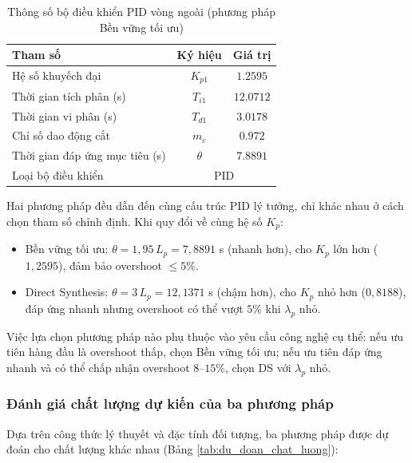 \documentclass[../main.tex]{subfiles}
\begin{document}
\begin{table}[H]
\centering
\caption{Thông số bộ điều khiển PID vòng ngoài (phương pháp Bền vững tối ưu)}
\label{tab:tham_so_pid_vong_ngoai}
\begin{tabular}{|l|c|c|}
\hline
\textbf{Tham số} & \textbf{Ký hiệu} & \textbf{Giá trị}\\ \hline
Hệ số khuyếch đại & $K_{p1}$ & $1.2595$\\ \hline
Thời gian tích phân (s) & $T_{i1}$ & $12.0712$\\ \hline
Thời gian vi phân (s) & $T_{d1}$ & $3.0178$\\ \hline
Chỉ số dao động cắt & $m_c$ & $0.972$\\ \hline
Thời gian đáp ứng mục tiêu (s) & $\theta$ & $7.8891$\\ \hline
Loại bộ điều khiển & \multicolumn{2}{c|}{PID}\\ \hline
\end{tabular}
\end{table}
\begin{tcolorbox}[colback=blue!5!white, colframe=blue!75!black, title={Phân tích so sánh DS với Bền vững tối ưu cho vòng ngoài}]
Hai phương pháp đều dẫn đến cùng cấu trúc PID lý tưởng, chỉ khác nhau ở cách chọn tham số chỉnh định. Khi quy đổi về cùng hệ số $K_p$:
\begin{itemize}
    \item Bền vững tối ưu: $\theta = 1{,}95\,L_p = 7{,}8891$ s (nhanh hơn), cho $K_p$ lớn hơn ($1{,}2595$), đảm bảo overshoot $\leq 5\%$.
    \item Direct Synthesis: $\theta = 3\,L_p = 12{,}1371$ s (chậm hơn), cho $K_p$ nhỏ hơn ($0{,}8188$), đáp ứng nhanh nhưng overshoot có thể vượt $5\%$ khi $\lambda_p$ nhỏ.
\end{itemize}
Việc lựa chọn phương pháp nào phụ thuộc vào yêu cầu công nghệ cụ thể: nếu ưu tiên hàng đầu là overshoot thấp, chọn Bền vững tối ưu; nếu ưu tiên đáp ứng nhanh và có thể chấp nhận overshoot $8$--$15\%$, chọn DS với $\lambda_p$ nhỏ.
\end{tcolorbox}

\subsubsection{Đánh giá chất lượng dự kiến của ba phương pháp}

Dựa trên công thức lý thuyết và đặc tính đối tượng, ba phương pháp được dự đoán cho chất lượng khác nhau (Bảng \ref{tab:du_doan_chat_luong}):
\end{document}

